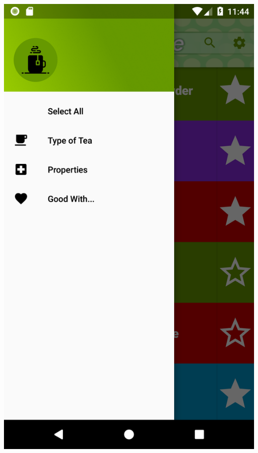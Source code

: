 \documentclass[a4paper,12pt]{article}
\begin{document}
\begin{spacing}{1}
	\includegraphics*[scale=0.1]{Screenshot/04.png}    

\end{spacing}
\end{document}
